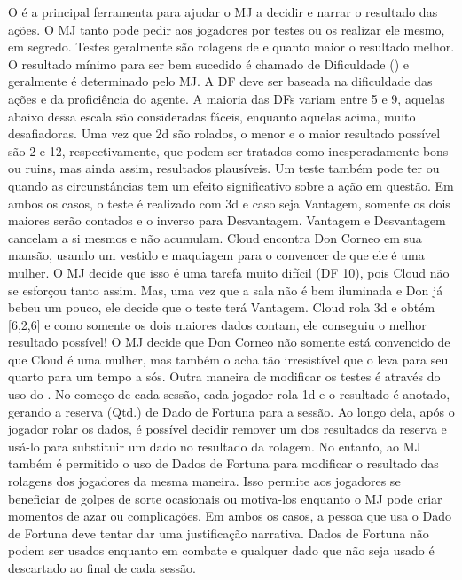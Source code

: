 	O  é a principal ferramenta para ajudar o MJ a decidir e narrar o resultado das ações. 
	O MJ tanto pode pedir aos jogadores por testes ou os realizar ele mesmo, em segredo. 
	Testes geralmente são rolagens de  e quanto maior o resultado melhor. O resultado mínimo para ser bem sucedido é chamado de Dificuldade () e geralmente é determinado pelo MJ. 
	A DF deve ser baseada na dificuldade das ações e da proficiência do agente. A maioria das DFs variam entre 5 e 9, aquelas abaixo dessa escala são consideradas fáceis, enquanto aquelas acima, muito desafiadoras.
%
\ofpar
%
	Uma vez que 2d são rolados, o menor e o maior resultado possível são 2 e 12, respectivamente, que podem ser tratados como inesperadamente bons ou ruins, mas ainda assim, resultados plausíveis.
	Um teste também pode ter  ou  quando as circunstâncias tem um efeito significativo sobre a ação em questão. 
	Em ambos os casos, o teste é realizado com 3d e caso seja Vantagem, somente os dois maiores serão contados e o inverso para Desvantagem. 
	Vantagem e Desvantagem cancelam a si mesmos e não acumulam.
%
\clearpage
%
{
	Cloud encontra Don Corneo em sua mansão, usando um vestido e maquiagem para o convencer de que ele é uma mulher. 
	O MJ decide que isso é uma tarefa muito difícil (DF 10), pois Cloud não se esforçou tanto assim. 
	Mas, uma vez que a sala não é bem iluminada e Don já bebeu um pouco, ele decide que o teste terá Vantagem. 
	Cloud rola 3d e obtém [6,2,6] e como somente os dois maiores dados contam, ele conseguiu o melhor resultado possível! 
	O MJ decide que Don Corneo não somente está convencido de que Cloud é uma mulher, mas também o acha tão irresistível que o leva para seu quarto para um tempo a sós.
}
%
\ofpar
%
	Outra maneira de modificar os testes é através do uso do . 
	No começo de cada sessão, cada jogador rola 1d e o resultado é anotado, gerando a reserva (Qtd.) de Dado de Fortuna para a sessão. 
	Ao longo dela, após o jogador rolar os dados, é possível decidir remover um dos resultados da reserva e usá-lo para substituir um dado no resultado da rolagem. 
	No entanto, ao MJ também é permitido o uso de Dados de Fortuna para modificar o resultado das rolagens dos jogadores da mesma maneira. 
	Isso permite aos jogadores se beneficiar de golpes de sorte ocasionais ou motiva-los enquanto o MJ pode criar momentos de azar ou complicações. 
	Em ambos os casos, a pessoa que usa o Dado de Fortuna deve tentar dar uma justificação narrativa. Dados de Fortuna não podem ser usados enquanto em combate e qualquer dado que não seja usado é descartado ao final de cada sessão.
